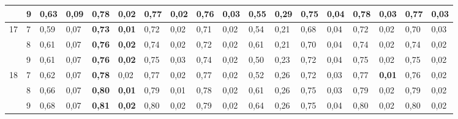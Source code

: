 \documentclass[conference]{IEEEtran}
\begin{document}
\begin{table}[]
\begin{tabular}{|cl|ll|ll|ll|ll|ll|ll|ll|ll|}
		\multicolumn{1}{|c|}{} & 9 & \multicolumn{1}{l|}{0,63} & 0,09 & \multicolumn{1}{l|}{\textbf{0,78}} & \textbf{0,02} & \multicolumn{1}{l|}{0,77} & 0,02 & \multicolumn{1}{l|}{0,76} & 0,03 & \multicolumn{1}{l|}{0,55} & 0,29 & \multicolumn{1}{l|}{0,75} & 0,04 & \multicolumn{1}{l|}{0,78} & 0,03 & \multicolumn{1}{l|}{0,77} & 0,03 \\ \hline
		\multicolumn{1}{|c|}{\multirow{3}{*}{17}} & 7 & \multicolumn{1}{l|}{0,59} & 0,07 & \multicolumn{1}{l|}{\textbf{0,73}} & \textbf{0,01} & \multicolumn{1}{l|}{0,72} & 0,02 & \multicolumn{1}{l|}{0,71} & 0,02 & \multicolumn{1}{l|}{0,54} & 0,21 & \multicolumn{1}{l|}{0,68} & 0,04 & \multicolumn{1}{l|}{0,72} & 0,02 & \multicolumn{1}{l|}{0,70} & 0,03 \\ \cline{2-18} 
		\multicolumn{1}{|c|}{} & 8 & \multicolumn{1}{l|}{0,61} & 0,07 & \multicolumn{1}{l|}{\textbf{0,76}} & \textbf{0,02} & \multicolumn{1}{l|}{0,74} & 0,02 & \multicolumn{1}{l|}{0,72} & 0,02 & \multicolumn{1}{l|}{0,61} & 0,21 & \multicolumn{1}{l|}{0,70} & 0,04 & \multicolumn{1}{l|}{0,74} & 0,02 & \multicolumn{1}{l|}{0,74} & 0,02 \\ \cline{2-18} 
		\multicolumn{1}{|c|}{} & 9 & \multicolumn{1}{l|}{0,61} & 0,07 & \multicolumn{1}{l|}{\textbf{0,76}} & \textbf{0,02} & \multicolumn{1}{l|}{0,75} & 0,03 & \multicolumn{1}{l|}{0,74} & 0,02 & \multicolumn{1}{l|}{0,50} & 0,23 & \multicolumn{1}{l|}{0,72} & 0,04 & \multicolumn{1}{l|}{0,75} & 0,02 & \multicolumn{1}{l|}{0,75} & 0,02 \\ \hline
		\multicolumn{1}{|c|}{\multirow{3}{*}{18}} & 7 & \multicolumn{1}{l|}{0,62} & 0,07 & \multicolumn{1}{l|}{\textbf{0,78}} & 0,02 & \multicolumn{1}{l|}{0,77} & 0,02 & \multicolumn{1}{l|}{0,77} & 0,02 & \multicolumn{1}{l|}{0,52} & 0,26 & \multicolumn{1}{l|}{0,72} & 0,03 & \multicolumn{1}{l|}{0,77} & \textbf{0,01} & \multicolumn{1}{l|}{0,76} & 0,02 \\ \cline{2-18} 
		\multicolumn{1}{|c|}{} & 8 & \multicolumn{1}{l|}{0,66} & 0,07 & \multicolumn{1}{l|}{\textbf{0,80}} & \textbf{0,01} & \multicolumn{1}{l|}{0,79} & 0,01 & \multicolumn{1}{l|}{0,78} & 0,02 & \multicolumn{1}{l|}{0,61} & 0,26 & \multicolumn{1}{l|}{0,75} & 0,03 & \multicolumn{1}{l|}{0,79} & 0,02 & \multicolumn{1}{l|}{0,79} & 0,02 \\ \cline{2-18} 
		\multicolumn{1}{|c|}{} & 9 & \multicolumn{1}{l|}{0,68} & 0,07 & \multicolumn{1}{l|}{\textbf{0,81}} & \textbf{0,02} & \multicolumn{1}{l|}{0,80} & 0,02 & \multicolumn{1}{l|}{0,79} & 0,02 & \multicolumn{1}{l|}{0,64} & 0,26 & \multicolumn{1}{l|}{0,75} & 0,04 & \multicolumn{1}{l|}{0,80} & 0,02 & \multicolumn{1}{l|}{0,80} & 0,02 \\ \hline

\end{tabular}
\end{table}
\end{document}
